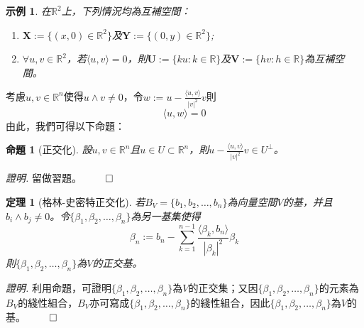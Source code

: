 \documentclass[12pt]{article}
\newcommand{\innerprod}[2]{\langle{#1},{#2}\rangle}
\newtheorem*{theorem}{定理}
\newtheorem*{proposition}{命題}
\newtheorem*{example}{示例}
\renewenvironment*{proof}{\textit{證明.}}{\hfill$\qed$}
\begin{document}
    \begin{example}
        在$\mathbb{R}^2$上，下列情況均為互補空間：\begin{enumerate}
            \item $\mathbf{X}:=\{(x,0)\in\mathbb{R}^2\}$及$\mathbf{Y}:=\{(0,y)\in\mathbb{R}^2\}$;
            \item $\forall u,v \in\mathbb{R}^2$，若$\innerprod{u}{v}=0$，則$\mathbf{U}:=\{ku:k\in\mathbb{R}\}$及$\mathbf{V}:=\{hv:h\in\mathbb{R}\}$為互補空間。
        \end{enumerate}
    \end{example}

    考慮$u,v\in\mathbb{R}^n$使得$u\wedge v\neq 0$，令$w:=u-\frac{\innerprod{u}{v}}{|v|^2}v$則$$\innerprod{u}{w}=0$$由此，我們可得以下命題：

    \begin{proposition}[正交化]
        設$u,v\in \mathbb{R}^n$且$u\in U\subset \mathbb{R}^n$，則$u-\frac{\innerprod{u}{v}}{|v|^2}v\in U^{\perp}$。
    \end{proposition}

    \begin{proof}
        留做習題。
    \end{proof}

    \begin{theorem}[格林-史密特正交化]
        若$B_V=\{b_1,b_2,\dots,b_n\}$為向量空間$V$的基，并且$b_i\wedge b_j\neq 0$。令$\{\beta_1,\beta_2,\dots,\beta_n\}$為另一基集使得$$\beta_n:=b_n-\sum_{k=1}^{n-1}\frac{\innerprod{\beta_k}{b_n}}{|\beta_k|^2}\beta_k$$則$\{\beta_1,\beta_2,\dots,\beta_n\}$為$V$的正交基。
    \end{theorem}

    \begin{proof}
        利用命題，可證明$\{\beta_1,\beta_2,\dots,\beta_n\}$為$V$的正交集；又因$\{\beta_1,\beta_2,\dots,\beta_n\}$的元素為$B_V$的綫性組合，$B_V$亦可寫成$\{\beta_1,\beta_2,\dots,\beta_n\}$的綫性組合，因此$\{\beta_1,\beta_2,\dots,\beta_n\}$為$V$的基。
    \end{proof}
\end{document}
